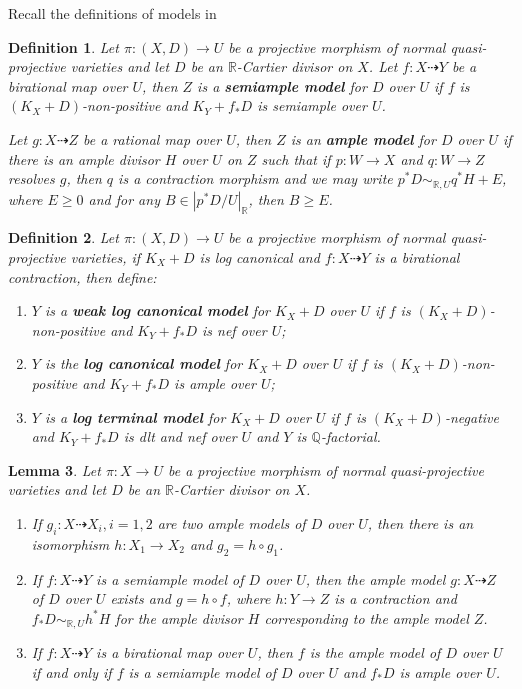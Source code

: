 \documentclass[11pt]{amsart}
\newtheorem{defn}{Definition}[section]
\newtheorem{lem}[defn]{Lemma}
\begin{document}
Recall the definitions of models in \cite{BCHM10}
\begin{defn}
  \cite[Definition 3.6.5]{BCHM10} Let $ \pi:(X,D)\to U $ be a projective morphism of normal quasi-projective varieties and let $D$ be an $\mathbb{R}$-Cartier divisor on $X$. Let $ f:X\dashrightarrow Y $ be a birational map over $ U $, then $ Z $ is a \textbf{semiample model } for $ D $ over $ U $ if $ f $ is $ (K_X+D) $-non-positive and $ K_Y+f_*D $ is semiample over $ U $.

  Let $ g:X\dashrightarrow Z $ be a rational map over $ U $, then $ Z $ is an \textbf{ample model } for $ D $ over $ U $ if there is  an ample divisor $H$  over $U$  on $Z$  such that if $p:W \to X $ and $q:W \to Z $ resolves $g$, then $q$ is a contraction morphism and we may write $p^*D \sim_{\mathbb{R},U} q^*H+E$, where $E\geqslant 0$ and for any $B \in |p^*D/U|_{\mathbb{R}}$, then $B\geqslant E$.
\end{defn}
\begin{defn}\label{models}
  \cite[Definition 3.6.7]{BCHM10} Let $ \pi:(X,D)\to U $ be a projective morphism of normal quasi-projective varieties, if $ K_X+D $ is log canonical and $ f:X\dashrightarrow Y $ is a birational contraction, then define:
  \begin{enumerate}
    \item $ Y $ is a \textbf{weak log canonical model} for $ K_X+D $ over $ U $ if $ f $ is $ (K_X+D) $-non-positive and $ K_Y+f_*D $ is nef over $ U $;
    \item $ Y $ is the \textbf{log canonical model} for $ K_X+D $ over $ U $ if $ f $ is $ (K_X+D) $-non-positive and $ K_Y+f_*D $ is ample over $ U $;
    \item $ Y $ is  a \textbf{log terminal model} for $ K_X+D $ over $ U $ if $ f $ is $ (K_X+D)$-negative and $ K_Y+f_*D $ is dlt and nef over $ U $ and $ Y $ is $ \mathbb{Q} $-factorial.
  \end{enumerate}
\end{defn}

\begin{lem}\cite[Lemma 3.6.6]{BCHM10}
  Let $\pi:X \to U$ be a projective morphism of normal quasi-projective varieties and let $D$ be an $\mathbb{R}$-Cartier divisor on $X$.
  \begin{enumerate}
    \item If $g_{i}:X \dashrightarrow X_{i}, i=1,2$ are two ample models of $D$ over $U$, then there is an isomorphism $h:X_{1}\to X_{2}$ and $g_{2}=h \circ g_{1}$.
    \item If $f:X \dashrightarrow Y$ is a semiample model of $D$ over $U$, then the ample model $g:X \dashrightarrow  Z$ of $D$ over $U$   exists and $g=h \circ f$, where $h:Y \to Z$ is a contraction and $f_*D \sim_{\mathbb{R},U}h^*H$ for the ample divisor $H$ corresponding to the ample model $Z$. 
  \item  If $f:X \dashrightarrow Y$ is a birational map over $U$, then $f$ is the ample model of $D$ over $U$ if and only if $f$ is a semiample model of $D$ over $U$ and $f_*D$ is ample over $U$.     
  \end{enumerate}
\end{lem}
\end{document}
